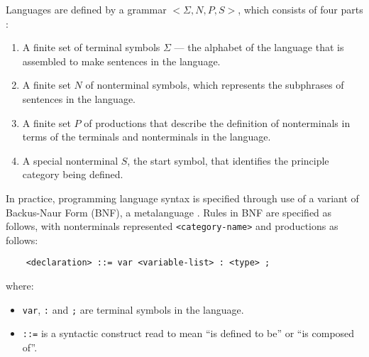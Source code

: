 \documentclass[a4paper,11pt]{report}
\begin{document}
Languages are defined by a grammar $<\Sigma,N,P,S>$, which consists of four parts \citep{slonneger1995formal}:
\begin{enumerate}
    \item A finite set of terminal symbols $\Sigma$ --- the alphabet of the language that is assembled to make sentences in the language.
    \item A finite set $N$ of nonterminal symbols, which represents the subphrases of sentences in the language.
    \item A finite set $P$ of productions that describe the definition of nonterminals in terms of the terminals and nonterminals in the language. 
    \item A special nonterminal $S$, the start symbol, that identifies the principle category being defined.
\end{enumerate}

In practice, programming language syntax is specified through use of a variant of Backus-Naur Form (BNF), a metalanguage \citep[pg. 21]{Mernik:2005:DDL:1118890.1118892}.
Rules in BNF are specified as follows, with nonterminals represented \lstinline{<category-name>} and productions as follows:
\begin{lstlisting}
    <declaration> ::= var <variable-list> : <type> ;
\end{lstlisting}
where:
\begin{itemize}
    \item \lstinline{var}, \lstinline{:} and \lstinline{;} are terminal symbols in the language. 
    \item \lstinline{::=} is a syntactic construct read to mean ``is defined to be'' or ``is composed of''.
\end{itemize}
\end{document}
